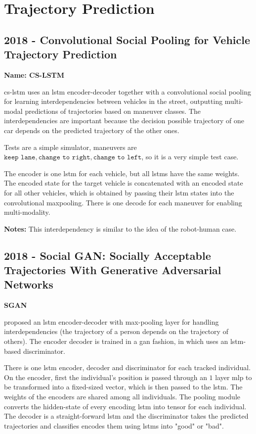 \section{Trajectory Prediction}\label{sec: traj prediction}

\subsection*{2018 - Convolutional Social Pooling for Vehicle Trajectory Prediction}

\textbf{Name: CS-LSTM}

\cite{deo2018convolutional} \gls{cs-lstm} uses an \gls{lstm} encoder-decoder together with a convolutional social pooling for learning interdependencies between vehicles in the street, outputting multi-modal predictions of trajectories based on maneuver classes.
%
The interdependencies are important because the decision possible trajectory of one car depends on the predicted trajectory of the other ones.

Tests are a simple simulator, maneuvers are ${\texttt{keep lane}, \texttt{change to right}, \texttt{change to left}}$, so it is a very simple test case.

The encoder is one \gls{lstm} for each vehicle, but all \glspl{lstm} have the same weights.
%
The encoded state for the target vehicle is concatenated with an encoded state for all other vehicles, which is obtained by passing their \gls{lstm} states into the convolutional maxpooling.
%
There is one decode for each maneuver for enabling multi-modality.

\textbf{Notes:} This interdependency is similar to the idea of the robot-human case.

\subsection*{2018 - Social GAN: Socially Acceptable Trajectories With Generative Adversarial Networks}

\textbf{SGAN}

\cite{gupta2018social} proposed an \gls{lstm} encoder-decoder with max-pooling layer for handling interdependencies (the trajectory of a person depends on the trajectory of others).
%
The encoder decoder is trained in a \gls{gan} fashion, in which uses an \gls{lstm}-based discriminator.

There is one \gls{lstm} encoder, decoder and discriminator for each tracked individual.
%
On the encoder, first the individual's position is passed through an $1$ layer \gls{mlp} to be transformed into a fixed-sized vector, which is then passed to the \gls{lstm}. The weights of the encoders are shared among all individuals.
%
The pooling module converts the hidden-state of every encoding \gls{lstm} into tensor for each individual.
%
The decoder is a straight-forward \gls{lstm} and the discriminator takes the predicted trajectories and classifies encodes them using \gls{lstms} into "good" or "bad".

